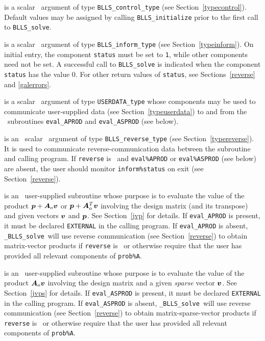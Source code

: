 \documentclass{galahad}
\newcommand{\packagename}{BLLS}
\newcommand{\fullpackagename}{\libraryname\_\packagename}
\newcommand{\solver}{{\tt \fullpackagename\_solve}}
\begin{document}
\begin{description}
 is a scalar \intentin\ argument of type
{\tt \packagename\_control\_type}
(see Section~\ref{typecontrol}). Default values may be assigned by calling
{\tt \packagename\_initialize} prior to the first call to
{\tt \packagename\_solve}.

 is a scalar \intentinout\ argument of type
{\tt \packagename\_inform\_type}
(see Section~\ref{typeinform}). On initial entry, the component {\tt status}
must be set to {\tt 1}, while other components need not be set.
A successful call to
{\tt \packagename\_solve}
is indicated when the  component {\tt status} has the value 0.
For other return values of {\tt status}, see Sections~\ref{reverse} and
\ref{galerrors}.

 is a scalar \intentinout\ argument of type
{\tt USERDATA\_type} whose components may be used
to communicate user-supplied data
(see Section~\ref{typeuserdata})
to and from the \optional\ subroutines
 {\tt eval\_APROD} and {\tt eval\_ASPROD} (see below).

 is an \optional\ scalar \intentinout\ argument of type
{\tt \packagename\_reverse\_type}
(see Section~\ref{typereverse}).
It is used to communicate reverse-communication data between the
subroutine and calling program.
If {\tt reverse} is \present\ and {\tt eval\%APROD} or {\tt eval\%ASPROD}
(see below) are absent, the user should monitor {\tt inform\%status} on exit
(see Section~\ref{reverse}).

 is an \optional\
user-supplied subroutine whose purpose is to evaluate the value of the
product ${\bm{p}} + {\bm{A}}_o {\bm{v}}$ or ${\bm{p}} + {\bm{A}}_o^T {\bm{v}}$
involving the design matrix (and its transpose) 
and given vectors ${\bm{v}}$ and ${\bm{p}}$.
See Section~\ref{jvp} for details.
If {\tt eval\_APROD} is present,
it must be declared {\tt EXTERNAL} in the calling program.
If {\tt eval\_APROD} is absent, \solver\ will use reverse communication
(see Section~\ref{reverse})
to obtain matrix-vector products if {\tt reverse} is \present\ or
otherwise require that the user has provided all relevant
components of {\tt prob\%A}.

 is an \optional\
user-supplied subroutine whose purpose is to evaluate the value of the
product ${\bm{A}}_o {\bm{v}}$  involving the design matrix and a given {\em sparse}
vector ${\bm{v}}$.
See Section~\ref{jvps} for details.
If {\tt eval\_ASPROD} is present,
it must be declared {\tt EXTERNAL} in the calling program.
If {\tt eval\_ASPROD} is absent, \solver\ will use reverse communication
(see Section~\ref{reverse})
to obtain matrix-sparse-vector products if {\tt reverse} is \present\ or
otherwise require that the user has provided all relevant
components of {\tt prob\%A}.


\end{description}
\end{document}
